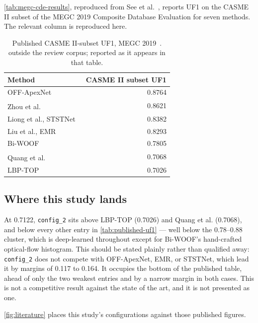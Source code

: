 \autoref{tab:megc-cde-results}, reproduced from See et al.~\cite{see2019}, reports UF1 on the CASME II subset of the MEGC 2019 Composite Database Evaluation for seven methods. The relevant column is reproduced here.

\begin{table}[htbp]
	\centering
	\begin{tabular}{l r}
		\hline
		\textbf{Method} & \textbf{CASME II subset UF1} \\
		\hline
		OFF-ApexNet~\cite{liong2019a}              & 0.8764 \\
		Zhou et al.\textsuperscript{\textdagger}   & 0.8621 \\
		Liong et al., STSTNet~\cite{liong2019b}    & 0.8382 \\
		Liu et al., EMR~\cite{liu2019}             & 0.8293 \\
		Bi-WOOF~\cite{liong2018}                   & 0.7805 \\
		Quang et al.\textsuperscript{\textdagger}  & 0.7068 \\
		LBP-TOP~\cite{zhaoG2007}                   & 0.7026 \\
		\hline
	\end{tabular}
	\caption[Published CASME II-subset UF1, MEGC 2019]{Published CASME II-subset UF1, MEGC 2019~\cite{see2019}. \textdagger{} outside the review corpus; reported as it appears in that table.}
	\label{tab:published-uf1}
\end{table}

\subsection{Where this study lands}
\label{sec:where-lands}

At 0.7122, \texttt{config\_2} sits above LBP-TOP (0.7026) and Quang et al. (0.7068), and below every other entry in \autoref{tab:published-uf1} --- well below the 0.78--0.88 cluster, which is deep-learned throughout except for Bi-WOOF's hand-crafted optical-flow histogram. This should be stated plainly rather than qualified away: \texttt{config\_2} does not compete with OFF-ApexNet, EMR, or STSTNet, which lead it by margins of 0.117 to 0.164. It occupies the bottom of the published table, ahead of only the two weakest entries and by a narrow margin in both cases. This is not a competitive result against the state of the art, and it is not presented as one.

\autoref{fig:literature} places this study's configurations against those published figures.


